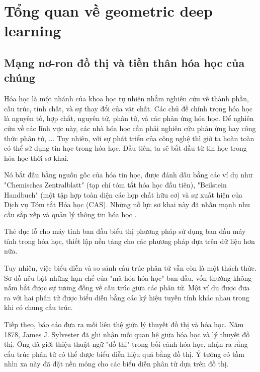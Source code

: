 \section{Tổng quan về geometric deep learning}


\subsection{Mạng nơ-ron đồ thị và tiền thân hóa học của chúng}
Hóa học là một nhánh của khoa học tự nhiên nhằm nghiên cứu về thành phần, cấu trúc, tính chất, và sự thay đổi của vật chất. Các chủ đề chính trong hóa học là nguyên tố, hợp chất, nguyên tử, phân tử, và các phản ứng hóa học. Để nghiên cứu về các lĩnh vực này, các nhà hóa học cần phải nghiên cứu phản ứng hay công thức phân tử, ... Tuy nhiên, với sự phát triển của công nghệ thì giờ ta hoàn toàn có thể sử dụng tin học trong hóa học. Đầu tiên, ta sẽ bắt đầu từ tin học trong hóa học thời sơ khai.

Nó bắt đầu bằng nguồn gốc của hóa tin học, được đánh dấu bằng các ví dụ như "Chemisches Zentralblatt" (tạp chí tóm tắt hóa học đầu tiên), "Beilstein Handbuch" (một tập hợp toàn diện các hợp chất hữu cơ) và sự xuất hiện của Dịch vụ Tóm tắt Hóa học (CAS). Những nỗ lực sơ khai này đã nhấn mạnh nhu cầu sắp xếp và quản lý thông tin hóa học \cite{geometricdeep2022}.

Thẻ đục lỗ cho máy tính ban đầu biểu thị phương pháp sử dụng ban đầu máy tính trong hóa học, thiết lập nền tảng cho các phương pháp dựa trên dữ liệu hơn nữa\cite{geometricdeep2022}.

Tuy nhiên, việc biểu diễn và so sánh cấu trúc phân tử vẫn còn là một thách thức. Sơ đồ nêu bật những hạn chế của "mã hóa hóa học" ban đầu, vốn thường không nắm bắt được sự tương đồng về cấu trúc giữa các phân tử\cite{geometricdeep2022}. Một ví dụ được đưa ra với hai phân tử được biểu diễn bằng các ký hiệu tuyến tính khác nhau trong khi có chung cấu trúc.

Tiếp theo, báo cáo đưa ra mối liên thệ giữa lý thuyết đồ thị và hóa học. Năm 1878, James J. Sylvester đã ghi nhận mối quan hệ giữa hóa học và lý thuyết đồ thị\cite{geometricdeep2022}. Ông đã giới thiệu thuật ngữ "đồ thị" trong bối cảnh hóa học, nhận ra rằng cấu trúc phân tử có thể được biểu diễn hiệu quả bằng đồ thị. Ý tưởng có tầm nhìn xa này đã đặt nền móng cho các biểu diễn phân tử dựa trên đồ thị.

